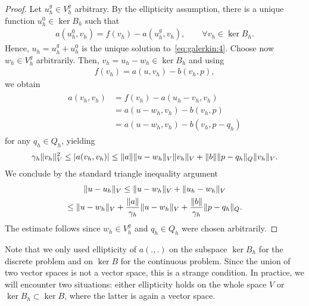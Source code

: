 \begin{proof}
  Let $u_h^g \in V_h^g$ arbitrary. By the ellipticity assumption,
  there is a unique function $u_h^0\in \ker{B_h}$ such that
  \begin{gather*}
    a(u_h^0,v_h) = f(v_h) - a(u_h^g,v_h),
    \qquad\forall v_h\in \ker{B_h}.
  \end{gather*}
  Hence, $u_h = u_h^g + u_h^0$ is the unique solution
  to~\eqref{eq:galerkin:4}. Choose now $w_h\in V_h^g$
  arbitrarily. Then, $v_h = u_h-w_h\in \ker{B_h}$ and using
  \begin{gather*}
    f(v_h) = a(u, v_h) - b(v_h, p),
  \end{gather*}
  we obtain
  \begin{gather}
    \begin{split}
      \label{eq:galerkin:9}
      a(v_h, v_h)
      &= f(v_h) - a(u_h-v_h, v_h) \\
      &= a(u-w_h, v_h) - b(v_h, p) \\
      &= a(u-w_h, v_h) - b(v_h, p-q_h)      
    \end{split}
  \end{gather}
  for any $q_h\in Q_h$, yielding
  \begin{gather*}
    \gamma_h\lVert v_h\rVert^2_V
    \le \lvert a(v_h, v_h)\rvert
    \le \lVert a\rVert \lVert u-w_h\rVert_V \lVert v_h\rVert_V
      + \lVert b\rVert \lVert p-q_h\rVert_Q \lVert v_h\rVert_V.
  \end{gather*}
  We conclude by the standard triangle inequality argument
  \begin{multline*}
    \lVert u-u_h\rVert_V \le \lVert u-w_h\rVert_V + \lVert u_h-w_h\rVert_V
    \\
    \le \lVert u-w_h\rVert_V + \frac{\lVert a\rVert}{\gamma_h} \lVert u-w_h\rVert_V
    + \frac{\lVert b\rVert}{\gamma_h} \lVert p-q_h\rVert_Q.
  \end{multline*}
  The estimate follows since $w_h\in V_h^g$ and $q_h\in Q_h$ were
  chosen arbitrarily.
\end{proof}

\begin{remark}
  Note that we only used ellipticity of $a(.,.)$ on the subspace
  $\ker{B_h}$ for the discrete problem and on $\ker B$ for the
  continuous problem. Since the union of two vector spaces is not a
  vector space, this is a strange condition. In practice, we will
  encounter two situations: either ellipticity holds on the whole
  space $V$ or $\ker{B_h}\subset\ker{B}$, where the latter is again a
  vector space.
\end{remark}

